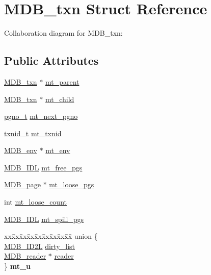 \hypertarget{struct_m_d_b__txn}{}\section{M\+D\+B\+\_\+txn Struct Reference}
\label{struct_m_d_b__txn}


Collaboration diagram for M\+D\+B\+\_\+txn\+:
\subsection*{Public Attributes}
\begin{DoxyCompactItemize}
\item 
\mbox{\hyperlink{struct_m_d_b__txn}{M\+D\+B\+\_\+txn}} $\ast$ \mbox{\hyperlink{struct_m_d_b__txn_abc63d15f4e57a73ed26089e1ab7fb866}{mt\+\_\+parent}}
\item 
\mbox{\hyperlink{struct_m_d_b__txn}{M\+D\+B\+\_\+txn}} $\ast$ \mbox{\hyperlink{struct_m_d_b__txn_a58c028bf009e3968696ba65d41f6aa81}{mt\+\_\+child}}
\item 
\mbox{\hyperlink{group__internal_gadb65f0424c9d3827bf6409087ad555cd}{pgno\+\_\+t}} \mbox{\hyperlink{struct_m_d_b__txn_aa805ac6e787ed14ffd131964638901bc}{mt\+\_\+next\+\_\+pgno}}
\item 
\mbox{\hyperlink{group__internal_gabbaef7c9c710f8652a62c32d748c040e}{txnid\+\_\+t}} \mbox{\hyperlink{struct_m_d_b__txn_a26512036328af11cdaeb6c9880859290}{mt\+\_\+txnid}}
\item 
\mbox{\hyperlink{struct_m_d_b__env}{M\+D\+B\+\_\+env}} $\ast$ \mbox{\hyperlink{struct_m_d_b__txn_a03c63e36f8e121d65172f1e5a1d70a55}{mt\+\_\+env}}
\item 
\mbox{\hyperlink{group__idls_ga238cc39c422225e05cb3897e641ca9e5}{M\+D\+B\+\_\+\+I\+DL}} \mbox{\hyperlink{struct_m_d_b__txn_a587e53ee229e04345eaba8e4f300c84a}{mt\+\_\+free\+\_\+pgs}}
\item 
\mbox{\hyperlink{struct_m_d_b__page}{M\+D\+B\+\_\+page}} $\ast$ \mbox{\hyperlink{struct_m_d_b__txn_a8ba581e64700739d049e172456305138}{mt\+\_\+loose\+\_\+pgs}}
\item 
int \mbox{\hyperlink{struct_m_d_b__txn_a2ff868cf712335c9c596ac8b10d73505}{mt\+\_\+loose\+\_\+count}}
\item 
\mbox{\hyperlink{group__idls_ga238cc39c422225e05cb3897e641ca9e5}{M\+D\+B\+\_\+\+I\+DL}} \mbox{\hyperlink{struct_m_d_b__txn_a1a41741f6a5a601fd60fab7175285fd8}{mt\+\_\+spill\+\_\+pgs}}
\item 
\mbox{\label{struct_m_d_b__txn_acf13c3197b192695065a2beded20601e}} 
\begin{tabbing}
xx\=xx\=xx\=xx\=xx\=xx\=xx\=xx\=xx\=\kill
union \{\\
\>\mbox{\hyperlink{group__idls_gafcc5d61c06c726db2be5d088dbc68d51}{MDB\_ID2L}} \mbox{\hyperlink{struct_m_d_b__txn_a0a89cc7b39f5aec84f629a2b43bb64d5}{dirty\_list}}\\
\>\mbox{\hyperlink{struct_m_d_b__reader}{MDB\_reader}} $\ast$ \mbox{\hyperlink{struct_m_d_b__txn_a0ca555e0c624a93f7106cfea434e9557}{reader}}\\
\} {\bfseries mt\_u}\\


\end{tabbing}
\end{DoxyCompactItemize}
